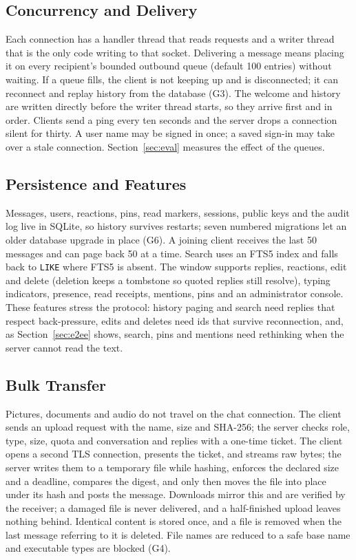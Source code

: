 \documentclass[conference]{IEEEtran}
\newcommand{\code}[1]{\texttt{#1}}
\begin{document}
\subsection{Concurrency and Delivery}\label{sec:concurrency}
Each connection has a handler thread that reads requests and a writer thread that is the only code writing to that socket. Delivering a message means placing it on every recipient's bounded outbound queue (default 100 entries) without waiting. If a queue fills, the client is not keeping up and is disconnected; it can reconnect and replay history from the database (G3). The welcome and history are written directly before the writer thread starts, so they arrive first and in order. Clients send a ping every ten seconds and the server drops a connection silent for thirty. A user name may be signed in once; a saved sign-in may take over a stale connection. Section~\ref{sec:eval} measures the effect of the queues.

\subsection{Persistence and Features}
Messages, users, reactions, pins, read markers, sessions, public keys and the audit log live in SQLite, so history survives restarts; seven numbered migrations let an older database upgrade in place (G6). A joining client receives the last 50 messages and can page back 50 at a time. Search uses an FTS5 index and falls back to \code{LIKE} where FTS5 is absent. The window supports replies, reactions, edit and delete (deletion keeps a tombstone so quoted replies still resolve), typing indicators, presence, read receipts, mentions, pins and an administrator console. These features stress the protocol: history paging and search need replies that respect back-pressure, edits and deletes need ids that survive reconnection, and, as Section~\ref{sec:e2ee} shows, search, pins and mentions need rethinking when the server cannot read the text.

\subsection{Bulk Transfer}
Pictures, documents and audio do not travel on the chat connection. The client sends an upload request with the name, size and SHA-256; the server checks role, type, size, quota and conversation and replies with a one-time ticket. The client opens a second TLS connection, presents the ticket, and streams raw bytes; the server writes them to a temporary file while hashing, enforces the declared size and a deadline, compares the digest, and only then moves the file into place under its hash and posts the message. Downloads mirror this and are verified by the receiver; a damaged file is never delivered, and a half-finished upload leaves nothing behind. Identical content is stored once, and a file is removed when the last message referring to it is deleted. File names are reduced to a safe base name and executable types are blocked (G4).
\end{document}
